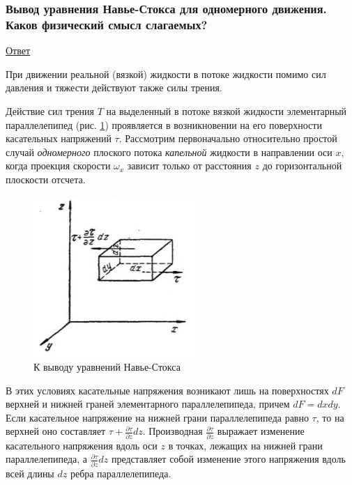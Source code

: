 \documentclass[12pt, a4paper]{article}
\begin{document}
	\subsubsection{Вывод уравнения Навье-Стокса для одномерного движения. Каков физический смысл слагаемых?}
	\begin{center}
		\underline{Ответ}
	\end{center}
	\par При движении реальной (вязкой) жидкости в потоке жидкости помимо сил давления и тяжести действуют также силы трения.
	\par Действие сил трения \( T \) на выделенный в потоке вязкой жидкости элементарный параллелепипед (рис. \ref{to_derive_the_Navier-Stokes_equations}) проявляется в возникновении на его поверхности касательных напряжений \( \tau \). Рассмотрим первоначально относительно простой случай \textit{одномерного} плоского потока \textit{капельной} жидкости в направлении оси \( x \), когда проекция скорости \( \omega_x \) зависит только от расстояния \( z \) до горизонтальной плоскости отсчета.
	\begin{figure}[H]
		\begin{center}
			\includegraphics{to_derive_the_Navier-Stokes_equations.png}
			\caption{К выводу уравнений Навье-Стокса}
			\label{to_derive_the_Navier-Stokes_equations}
		\end{center}
	\end{figure}
	\par В этих условиях касательные напряжения возникают лишь на поверхностях \( dF \) верхней и нижней граней элементарного параллелепипеда, причем \( dF = dxdy \). Если касательное напряжение на нижней грани параллелепипеда равно \( \tau \), то на верхней оно составляет \( \tau + \frac{\partial \tau}{\partial z} dz \). Производная \( \frac{\partial \tau}{\partial z} \) выражает изменение касательного напряжения вдоль оси \( z \) в точках, лежащих на нижней грани параллелепипеда, а \( \frac{\partial \tau}{\partial z} dz \) представляет собой изменение этого напряжения вдоль всей длины \( dz \) ребра параллелепипеда.
\end{document}
